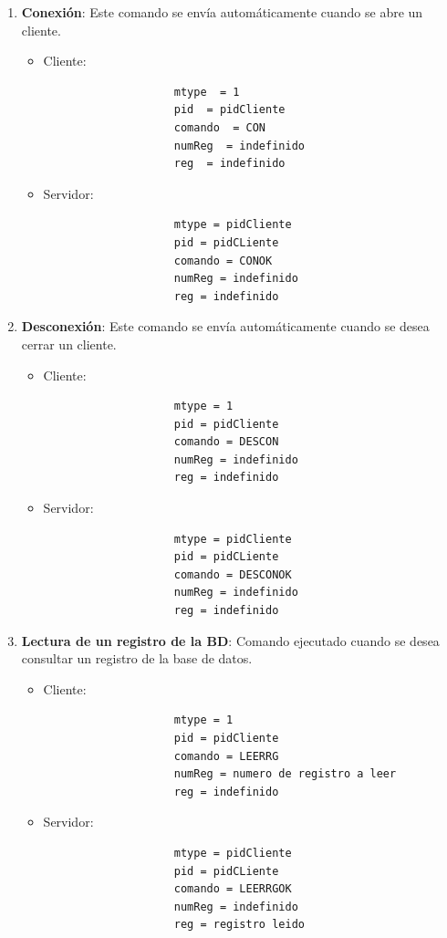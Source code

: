 \documentclass[a4paper,10pt]{article}
\begin{document}
	\begin{enumerate}
		\item{\bf Conexi\'on}: Este comando se env\'ia autom\'aticamente cuando se abre un cliente.
			\begin{itemize}
				\item Cliente:
				\begin{verbatim}
					mtype  = 1
					pid  = pidCliente
					comando  = CON
					numReg  = indefinido
					reg  = indefinido
				\end{verbatim}
				\item Servidor:
				\begin{verbatim}
					mtype = pidCliente 
					pid = pidCLiente
					comando = CONOK
					numReg = indefinido
					reg = indefinido
				\end{verbatim}
			\end{itemize}
		\item{\bf Desconexi\'on}: Este comando se env\'ia autom\'aticamente cuando se desea cerrar un cliente.
			\begin{itemize}
				\item Cliente:
				\begin{verbatim}
					mtype = 1
					pid = pidCliente
					comando = DESCON 
					numReg = indefinido
					reg = indefinido
				\end{verbatim}
				\item Servidor:
				\begin{verbatim}
					mtype = pidCliente 
					pid = pidCLiente
					comando = DESCONOK 
					numReg = indefinido
					reg = indefinido
				\end{verbatim}
			\end{itemize}
		\item{\bf Lectura de un registro de la BD}: Comando ejecutado cuando se desea consultar un registro de la base de datos.
			\begin{itemize}
				\item Cliente:
				\begin{verbatim}
					mtype = 1
					pid = pidCliente
					comando = LEERRG 
					numReg = numero de registro a leer
					reg = indefinido
				\end{verbatim}
				\item Servidor:
				\begin{verbatim}
					mtype = pidCliente 
					pid = pidCLiente
					comando = LEERRGOK
					numReg = indefinido
					reg = registro leido
				\end{verbatim}
			\end{itemize}


\end{enumerate}
\end{document}
